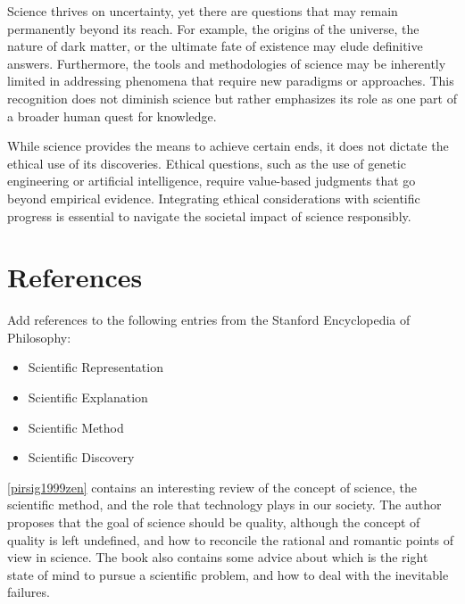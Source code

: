 Science thrives on uncertainty, yet there are questions that may remain permanently beyond its reach. For example, the origins of the universe, the nature of dark matter, or the ultimate fate of existence may elude definitive answers. Furthermore, the tools and methodologies of science may be inherently limited in addressing phenomena that require new paradigms or approaches. This recognition does not diminish science but rather emphasizes its role as one part of a broader human quest for knowledge.

While science provides the means to achieve certain ends, it does not dictate the ethical use of its discoveries. Ethical questions, such as the use of genetic engineering or artificial intelligence, require value-based judgments that go beyond empirical evidence. Integrating ethical considerations with scientific progress is essential to navigate the societal impact of science responsibly.


%
%

\section*{References}

{\color{red} Add references to the following entries from the Stanford Encyclopedia of Philosophy:

\begin{itemize}
\item Scientific Representation
\item Scientific Explanation
\item Scientific Method
\item Scientific Discovery
\end{itemize}

}


\ref{pirsig1999zen} contains an interesting review of the concept of science, the scientific method, and the role that technology plays in our society. The author proposes that the goal of science should be quality, although the concept of quality is left undefined, and how to reconcile the rational and romantic points of view in science. The book also contains some advice about which is the right state of mind to pursue a scientific problem, and how to deal with the inevitable failures.


